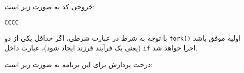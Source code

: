 \begin{qsolve}
	خروجی کد به صورت زیر است:
	
	\begin{latin}
		\texttt{CCCC}
	\end{latin}
	
	با توجه به شرط در عبارت شرطی، اگر حداقل یکی از دو \texttt{fork()} اولیه موفق باشد (یعنی یک فرآیند فرزند ایجاد شود)، عبارت داخل \texttt{if} اجرا خواهد شد.
	
	درخت پردازش برای این برنامه به صورت زیر است:
	
	\begin{center}
	\end{center}
	
\end{qsolve}